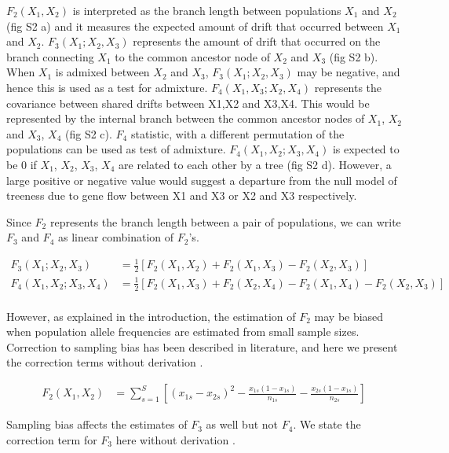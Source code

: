 \documentclass[12pt, letterpaper]{article}
\begin{document}
$F_2(X_1,X_2)$ is interpreted as the branch length between populations $X_1$ and $X_2$ (fig S2 a) and it measures the expected amount of drift that occurred between $X_1$ and $X_2$. $F_3(X_1;X_2,X_3)$ represents the amount of drift that occurred on the branch connecting $X_1$ to the common ancestor node of $X_2$ and $X_3$ (fig S2 b). When $X_1$ is admixed between $X_2$ and $X_3$, $F_3(X_1;X_2,X_3)$ may be negative, and hence this is used as a test for admixture\cite{peter_admixture_2016, patterson_ancient_2012}. $F_4(X_1,X_3;X_2,X_4)$ represents the covariance between shared drifts between X1,X2 and X3,X4. This would be represented by the internal branch between the common ancestor nodes of $X_1$, $X_2$ and $X_3$, $X_4$ (fig S2 c). $F_4$ statistic, with a different permutation of the populations can be used as test of admixture. $F_4(X_1,X_2;X_3,X_4)$ is expected to be 0 if $X_1$, $X_2$, $X_3$, $X_4$ are related to each other by a tree (fig S2 d). However, a large positive or negative value would suggest a departure from the null model of treeness due to gene flow between X1 and X3 or X2 and X3 respectively.

Since $F_2$ represents the branch length between a pair of populations, we can write $F_3$ and $F_4$ as linear combination of $F_2$'s.

\begin{align}\label{eq:f3_f4}
F_3(X_1;X_2,X_3) &= \frac{1}{2} [F_2(X_1,X_2) + F_2(X_1,X_3) - F_2(X_2,X_3)]\nonumber\\
F_4(X_1,X_2;X_3,X_4) &= \frac{1}{2} [F_2(X_1,X_3) + F_2(X_2,X_4) - F_2(X_1,X_4) - F_2(X_2,X_3)]\nonumber\\
\end{align}

However, as explained in the introduction, the estimation of $F_2$ may be biased when population allele frequencies are estimated from small sample sizes. Correction to sampling bias has been described in literature, and here we present the correction terms without derivation \cite{peter_admixture_2016, patterson_ancient_2012}.

\begin{align}\label{eq:f2_correction}
F_2(X_1,X_2) &= \sum_{s=1}^S[(x_{1s} - x_{2s})^2 - \frac{x_{1s}(1-x_{1s})}{n_{1s}} - \frac{x_{2s}(1-x_{1s})}{n_{2s}}]
\end{align}

Sampling bias affects the estimates of $F_3$ as well but not $F_4$. We state the correction term for $F_3$ here without derivation \cite{peter_admixture_2016, patterson_ancient_2012}.
\end{document}
